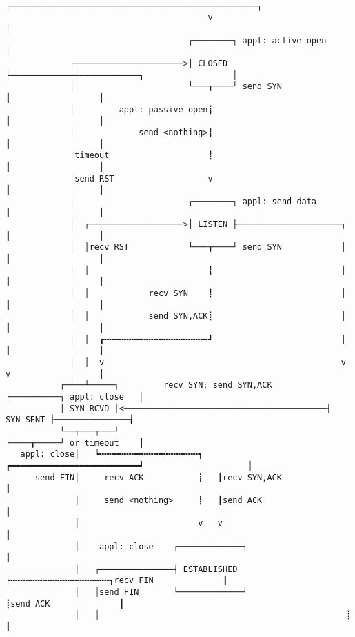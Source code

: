\documentclass[varwidth=60em,crop]{standalone}
\begin{document}
\begin{verbatim}
                                         ┌──────────────────────────────────────────────────┐
                                         v                                                  │
                                     ┌────────┐ appl: active open                           │
             ┌──────────────────────>│ CLOSED ┝━━━━━━━━━━━━━━━━━━━━━━━━━━┓                  │
             │                       └───┰────┘ send SYN                 ┃                  │
             │         appl: passive open┋                               ┃                  │
             │             send <nothing>┋                               ┃                  │
             │timeout                    ┋                               ┃                  │
             │send RST                   v                               ┃                  │
             │                       ┌────────┐ appl: send data          ┃                  │
             │  ┌───────────────────>│ LISTEN ├─────────────────────┐    ┃                  │
             │  │recv RST            └───┰────┘ send SYN            │    ┃                  │
             │  │                        ┋                          │    ┃                  │
             │  │            recv SYN    ┋                          │    ┃                  │
             │  │            send SYN,ACK┋                          │    ┃                  │
             │  │  ┏╍╍╍╍╍╍╍╍╍╍╍╍╍╍╍╍╍╍╍╍╍┛                          │    ┃                  │
             │  │  v                                                v    v                  │
           ┌─┴──┴─────┐         recv SYN; send SYN,ACK           ┌──────────┐ appl: close   │
           │ SYN_RCVD │<─────────────────────────────────────────┤ SYN_SENT ├───────────────┧
           └──┬───┰───┘                                          └────┰─────┘ or timeout    ┃
   appl: close│   ┗╍╍╍╍╍╍╍╍╍╍╍╍╍╍╍╍╍╍╍╍┓   ┏━━━━━━━━━━━━━━━━━━━━━━━━━━┛                     ┃
      send FIN│     recv ACK           ┋   ┃recv SYN,ACK                                    ┃
              │     send <nothing>     ┋   ┃send ACK                                        ┃
              │                        v   v                                                ┃
              │    appl: close    ┌─────────────┐                                           ┃
              │   ┏━━━━━━━━━━━━━━━┥ ESTABLISHED ┝╍╍╍╍╍╍╍╍╍╍╍╍╍╍╍╍╍╍╍╍┓recv FIN              ┃
              │   ┃send FIN       └─────────────┘                    ┋send ACK              ┃
              │   ┃                                                  ┋                      ┃

\end{verbatim}
\end{document}
